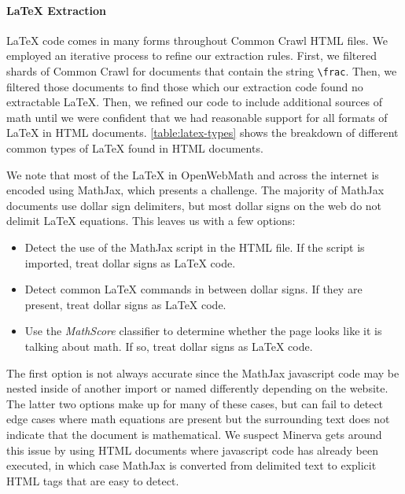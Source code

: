 

\paragraph{\LaTeX{} Extraction} \LaTeX{} code comes in many forms throughout Common Crawl HTML files. We employed an iterative process to refine our extraction rules. First, we filtered shards of Common Crawl for documents that contain the string \texttt{\textbackslash frac}. Then, we filtered those documents to find those which our extraction code found no extractable \LaTeX{}. Then, we refined our code to include additional sources of math until we were confident that we had reasonable support for all formats of \LaTeX{} in HTML documents. \autoref{table:latex-types} shows the breakdown of different common types of \LaTeX{} found in HTML documents. 

We note that most of the \LaTeX{} in OpenWebMath and across the internet is encoded using MathJax, which presents a challenge. The majority of MathJax documents use dollar sign delimiters, but most dollar signs on the web do not delimit \LaTeX{} equations. This leaves us with a few options:

\begin{itemize}
    \item Detect the use of the MathJax script in the HTML file. If the script is imported, treat dollar signs as \LaTeX{} code.
    \item Detect common \LaTeX{} commands in between dollar signs. If they are present, treat dollar signs as \LaTeX{} code.
    \item Use the \textit{MathScore} classifier to determine whether the page looks like it is talking about math. If so, treat dollar signs as \LaTeX{} code.
\end{itemize}

The first option is not always accurate since the MathJax javascript code may be nested inside of another import or named differently depending on the website. The latter two options make up for many of these cases, but can fail to detect edge cases where math equations are present but the surrounding text does not indicate that the document is mathematical. We suspect Minerva \citep{lewkowycz2022solving} gets around this issue by using HTML documents where javascript code has already been executed, in which case MathJax is converted from delimited text to explicit HTML tags that are easy to detect.

